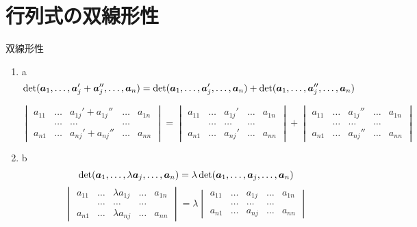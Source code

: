 \documentclass[leqno,autodetect-engine, dvipdfmx-if-dvi,ja=standard]{bxjsarticle}
\begin{document}
	\section{行列式の双線形性}
		\begin{thm} 双線形性
			\begin{enumerate}
				\item a
					\begin{equation}
						\det(\boldsymbol{a}_1, \dots, \boldsymbol{a}_j' + \boldsymbol{a}_j'', \dots, \boldsymbol{a}_n) = \det(\boldsymbol{a}_1, \dots, \boldsymbol{a}_j', \dots, \boldsymbol{a}_n) + \det(\boldsymbol{a}_1, \dots, \boldsymbol{a}_j'', \dots, \boldsymbol{a}_n)  
					\end{equation}
				
					\begin{equation}
						\begin{vmatrix}
							a_{1 1} & \dots & a_{1 j}' + a_{1 j}''  & \dots & a_{1 n} \\
							           & \dots &   \dots                & \dots &           \\
							a_{n 1} & \dots & a_{n j}' + a_{n j}'' & \dots & a_{n n}
						\end{vmatrix} 
						=
						\begin{vmatrix}
							a_{1 1} & \dots & a_{1 j}' & \dots & a_{1 n} \\
							& \dots &   \dots                & \dots &           \\
							a_{n 1} & \dots & a_{n j}' & \dots & a_{n n}
						\end{vmatrix} 
						+
						\begin{vmatrix}
							a_{1 1} & \dots & a_{1 j}''  & \dots & a_{1 n} \\
							& \dots &   \dots                & \dots &           \\
							a_{n 1} & \dots &  a_{n j}'' & \dots & a_{n n}
						\end{vmatrix}
					\end{equation}
				\item b
					\begin{equation}
						\det(\boldsymbol{a}_1, \dots, \lambda \boldsymbol{a}_j, \dots, \boldsymbol{a}_n) = \lambda \det(\boldsymbol{a}_1, \dots, \boldsymbol{a}_j, \dots, \boldsymbol{a}_n)
					\end{equation}
					\begin{equation}
						\begin{vmatrix}
							a_{1 1} & \dots & \lambda a_{1 j} & \dots & a_{1 n} \\
							& \dots &   \dots                & \dots &           \\
							a_{n 1} & \dots & \lambda a_{n j}  & \dots & a_{n n}
						\end{vmatrix} 
						= \lambda
						\begin{vmatrix}
							a_{1 1} & \dots & a_{1 j} & \dots & a_{1 n} \\
							& \dots &   \dots                & \dots &           \\
							a_{n 1} & \dots & a_{n j} & \dots & a_{n n}
						\end{vmatrix} 
					\end{equation}
			\end{enumerate}
		\end{thm}
\end{document}

